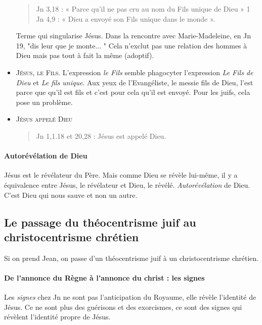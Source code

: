 \begin{itemize}
\begin{quote}
Jn 3,18 : « Parce qu'il ne pas cru au nom du Fils unique de Dieu » 1 Jn
4,9 : « Dieu a envoyé son Fils unique dans le monde ».
         \end{quote}
         Terme qui singularise Jésus. Dans la rencontre avec Marie-Madeleine, en Jn 19, "dis leur que je monte... "
         Cela n'exclut pas une relation des hommes à Dieu mais pas tout à fait la même (adoptif).
         \item \textsc{Jésus, le Fils}. L'expression \textit{le Fils} semble phagocyter l'expression \textit{Le Fils de Dieu} et \textit{Le fils unique}. Aux yeux de l'Evangéliste, le messie fils de Dieu, l'est parce que qu'il est fils et c'est pour cela qu'il est envoyé. Pour les juifs, cela pose un problème.  
                                
        \item \textsc{Jésus appelé Dieu} 
           \begin{quote}
               Jn 1,1.18 et 20,28 : Jésus est appelé Dieu.
           \end{quote}                         
         \end{itemize}
     \paragraph{Autorévélation de Dieu}Jésus est le révélateur du Père. Mais comme Dieu se révèle lui-même, il y a équivalence entre Jésus, le révélateur et Dieu, le révélé. \textit{Autorévélation} de Dieu. C'est Dieu qui nous sauve et non un autre.
   
     
    \subsection{Le passage du théocentrisme juif au christocentrisme chrétien}
     
     Si on prend Jean, on passe d'un théocentrisme juif à un christocentrisme chrétien. 
     
     \paragraph{De l'annonce du Règne à l'annonce du christ : les signes} Les \textit{signes} chez Jn ne sont pas l'anticipation du Royaume, elle révèle l'identité de Jésus. Ce ne sont plus des guérisons et des exorcismes, ce sont des signes qui révèlent l'identité propre de Jésus. 
     

